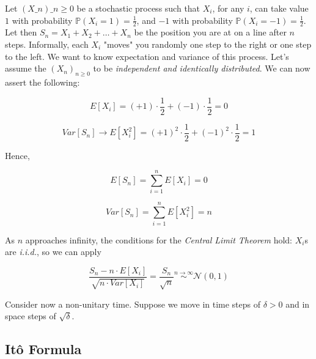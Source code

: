 \documentclass[twoside,openright,titlepage,headinclude,12pt,a4paper,BCOR5mm,footinclude]{book}
\theoremstyle{definition}
\begin{document}
  Let   $(X\_n)\_{n   \geq    0}$   be   a   stochastic    process   such   that
  \(X_i\),   for   any   \(i\),   can  take   value   \(1\)   with   probability
  \(\mathbb{P}(X_i=1)=\frac{1}{2}\),     and     \(-1\)     with     probability
  \(\mathbb{P}(X_i=-1)=\frac{1}{2}\). Let then \(S_n = X_1 + X_2 + \ldots +X_n\)
  be the  position you  are at  on a  line after  \(n\) steps.  Informally, each
  \(X_i\) "moves" you randomly one step to the right or one step to the left. We
  want  to know  expectation  and variance  of this  process.  Let's assume  the
  \((X_n)_{n \geq  0}\) to be \textit{independent  and identically distributed}.
  We can now assert the following:

  \[
    E\left[X_i\right] = (+1) \cdot \frac{1}{2} + (-1) \cdot \frac{1}{2} = 0
  \]
    
  \[
    Var\left[S_n\right] \to E\left[X_i^2\right] = (+1)^2 \cdot \frac{1}{2} + (-1)^2 \cdot \frac{1}{2} = 1
  \]

  Hence,

  \[
    E\left[S_n\right] = \sum_{i=1}^n E\left[X_i\right] = 0
  \]

  \[
    Var\left[S_n\right] = \sum_{i=1}^n E\left[X_i^2\right] = n
  \]

  As \(n\)  approaches infinity,  the conditions  for the  \textit{Central Limit
  Theorem} hold: \(X_i\)s are \textit{i.i.d.}, so we can apply

  \[
    \frac{S_n - n \cdot E\left[X_i\right]}{\sqrt{n \cdot Var\left[X_i\right]}}
    = \frac{S_n}{\sqrt{n}} \overset{n \to \infty}{\sim} \mathcal{N}(0,1)
  \]

  Consider now a non-unitary time. Suppose we move in time steps of \(\delta > 0\)
  and in space steps of \(\sqrt{\delta}\).


  \subsection{It\^o Formula}
\end{document}
